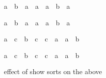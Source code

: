 \begin{isabellebody}
\begin{isamarkuptext}
\begin{isabelle}%
{\isacharparenleft}a\ {\isacharasterisk}\ b\ {\isacharequal}\ {\isacharparenleft}{}{\isasymColon}{\isacharprime}a{\isacharparenright}{\isacharparenright}\ {\isacharequal}\ {\isacharparenleft}a\ {\isacharequal}\ {\isacharparenleft}{}{\isasymColon}{\isacharprime}a{\isacharparenright}\ {\isasymor}\ b\ {\isacharequal}\ {\isacharparenleft}{}{\isasymColon}{\isacharprime}a{\isacharparenright}{\isacharparenright}%
\end{isabelle}

\begin{isabelle}%
{\isacharparenleft}a\ {\isacharasterisk}\ b\ {\isacharequal}\ {\isacharparenleft}{}{\isasymColon}{\isacharprime}a{\isacharparenright}{\isacharparenright}\ {\isacharequal}\ {\isacharparenleft}a\ {\isacharequal}\ {\isacharparenleft}{}{\isasymColon}{\isacharprime}a{\isacharparenright}\ {\isasymor}\ b\ {\isacharequal}\ {\isacharparenleft}{}{\isasymColon}{\isacharprime}a{\isacharparenright}{\isacharparenright}%
\end{isabelle}

\begin{isabelle}%
{\isacharparenleft}a\ {\isacharasterisk}\ c\ {\isacharequal}\ b\ {\isacharasterisk}\ c{\isacharparenright}\ {\isacharequal}\ {\isacharparenleft}c\ {\isacharequal}\ {\isacharparenleft}{}{\isasymColon}{\isacharprime}a{\isacharparenright}\ {\isasymor}\ a\ {\isacharequal}\ b{\isacharparenright}%
\end{isabelle}

\begin{isabelle}%
{\isacharparenleft}a\ {\isacharasterisk}\ c\ {\isacharequal}\ b\ {\isacharasterisk}\ c{\isacharparenright}\ {\isacharequal}\ {\isacharparenleft}c\ {\isacharequal}\ {\isacharparenleft}{}{\isasymColon}{\isacharprime}a{\isacharparenright}\ {\isasymor}\ a\ {\isacharequal}\ b{\isacharparenright}%
\end{isabelle}
%
\end{isamarkuptext}%
\isamarkuptrue%
\isamarkupfalse%
%
\begin{isamarkuptext}%
effect of show sorts on the above


\end{isamarkuptext}
\end{isabellebody}
